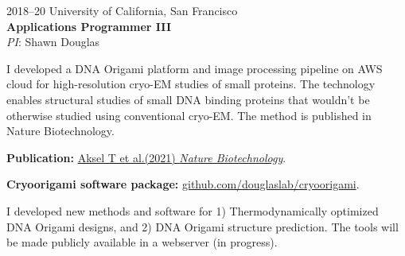 \documentclass[12pt,letterpaper]{report}
\newcommand{\listitemspace}{0.25em}
\renewenvironment{itemize}
{\begin{list}{}{\setlength{\leftmargin}{0em}
                \setlength{\parskip}{0em}
                \setlength{\itemsep}{\listitemspace}
                \setlength{\parsep}{\listitemspace}}}
{\end{list}}
\begin{document}
\begin{tablist}
        \item[2018--20] \tab{}University of California, San Francisco \\
                             \textbf{Applications Programmer III} \\
                             \textit{PI}: Shawn Douglas \\
                             \begin{itemize}
                                \item \textbullet \hspace{0.2cm} I developed a DNA Origami platform and image processing pipeline on AWS cloud for high-resolution cryo-EM studies of small proteins. The technology enables structural studies of small DNA binding proteins that wouldn't be otherwise studied using conventional cryo-EM. The method is published in Nature Biotechnology. 
                                \begin{itemize}
                                    \item \hspace{1cm} \textbf{Publication:} \href{https://doi.org/10.1038/s41587-020-0716-8}{Aksel T et al.(2021) \textit{Nature Biotechnology}}. 
                                    \item \hspace{1cm} \textbf{Cryoorigami software package:} \href{https://github.com/douglaslab/cryoorigami} {github.com/douglaslab/cryoorigami}. 
                                \end{itemize}
                                \item \textbullet \hspace{0.2cm} I developed new methods and software for 1) Thermodynamically optimized DNA Origami designs, and 2) DNA Origami structure prediction. The tools will be made publicly available in a webserver (in progress).
                             \end{itemize} 


\end{tablist}
\end{document}
